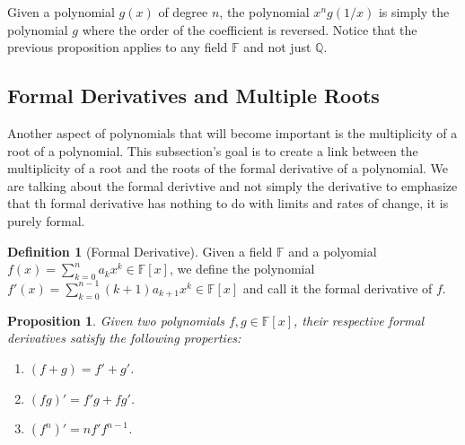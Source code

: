 \documentclass{article}
\theoremstyle{plain}
\newtheorem{proposition}[theorem]{Proposition}
\theoremstyle{definition}
\newtheorem*{definition}{Definition}
\newcommand{\Q}{\mathbb{Q}}
\newcommand{\F}{\mathbb{F}}
\begin{document}
Given a polynomial $g(x)$ of degree $n$, the polynomial $x^n g(1/x)$ is simply the polynomial $g$ where the order of the coefficient is reversed. Notice that the previous proposition applies to any field $\F$ and not just $\Q$.

\subsection{Formal Derivatives and Multiple Roots}

Another aspect of polynomials that will become important is the multiplicity of a root of a polynomial. This subsection's goal is to create a link between the multiplicity of a root and the roots of the formal derivative of a polynomial. We are talking about the formal derivtive and not simply the derivative to emphasize that th formal derivative has nothing to do with limits and rates of change, it is purely formal.

\begin{definition}[Formal Derivative]
    Given a field $\F$ and a polyomial $f(x) = \sum_{k=0}^{n}a_kx^k \in \F[x]$, we define the polynomial $f'(x) = \sum_{k=0}^{n-1}(k+1)a_{k+1}x^k \in \F[x]$ and call it the formal derivative of $f$.
\end{definition}

\begin{proposition}
    Given two polynomials $f,g \in \F[x]$, their respective formal derivatives satisfy the following properties:
    \begin{enumerate}
        \item $(f + g) = f' + g'$.
        \item $(fg)' = f'g + fg'$.
        \item $(f^n)' = nf' f^{n-1}$.
    \end{enumerate}
\end{proposition}
\end{document}
